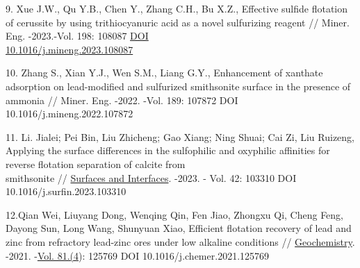 \begin{references}
9. Xue J.W., Qu Y.B., Chen Y., Zhang C.H., Bu X.Z., Effective sulfide
flotation of cerussite by using trithiocyanuric acid as a novel
sulfurizing reagent // Miner. Eng. -2023.-Vol. 198: 108087
\href{https://doi.org/10.1016/j.mineng.2023.108087}{DOI\\
10.1016/j.mineng.2023.108087}

10. Zhang S., Xian Y.J., Wen S.M., Liang G.Y., Enhancement of xanthate
adsorption on lead-modified and sulfurized smithsonite surface in the
presence of ammonia // Miner. Eng. -2022. -Vol. 189: 107872 DOI
10.1016/j.mineng.2022.107872

11. Li. Jialei; Pei Bin, Liu Zhicheng; Gao Xiang; Ning Shuai; Cai Zi,
Liu Ruizeng, Applying the surface differences in the sulfophilic and
oxyphilic affinities for reverse flotation separation of calcite from\\
smithsonite // \href{javascript:void(0)}{Surfaces and Interfaces}.
-2023. - Vol. 42: 103310 DOI 10.1016/j.surfin.2023.103310

12.Qian Wei, Liuyang Dong, Wenqing Qin, Fen Jiao, Zhongxu Qi, Cheng
Feng, Dayong Sun, Long Wang, Shunyuan Xiao, Efficient flotation recovery
of lead and zinc from refractory lead-zinc ores under low alkaline
conditions //
\href{https://www.sciencedirect.com/journal/geochemistry}{Geochemistry}.
-2021.
-\href{https://www.sciencedirect.com/journal/geochemistry/vol/81/issue/4}{Vol.
81.(4}): 125769 DOI 10.1016/j.chemer.2021.125769
\end{references}

